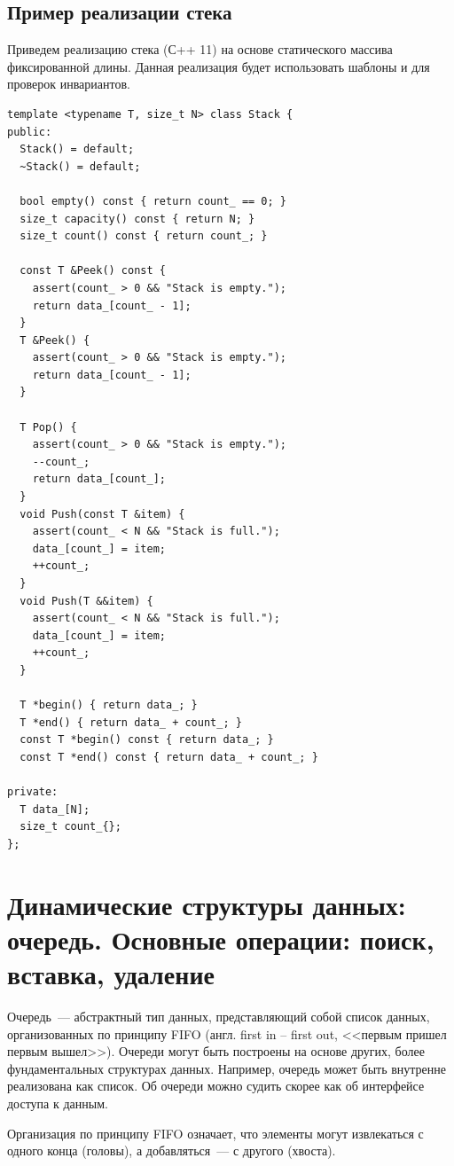 \subsection{Пример реализации стека}
Приведем реализацию стека (С++ 11) на основе статического массива фиксированной длины. Данная реализация будет использовать шаблоны и
 для проверок инвариантов.

\begin{verbatim}
template <typename T, size_t N> class Stack {
public:
  Stack() = default;
  ~Stack() = default;

  bool empty() const { return count_ == 0; }
  size_t capacity() const { return N; }
  size_t count() const { return count_; }

  const T &Peek() const {
    assert(count_ > 0 && "Stack is empty.");
    return data_[count_ - 1];
  }
  T &Peek() {
    assert(count_ > 0 && "Stack is empty.");
    return data_[count_ - 1];
  }

  T Pop() {
    assert(count_ > 0 && "Stack is empty.");
    --count_;
    return data_[count_];
  }
  void Push(const T &item) {
    assert(count_ < N && "Stack is full.");
    data_[count_] = item;
    ++count_;
  }
  void Push(T &&item) {
    assert(count_ < N && "Stack is full.");
    data_[count_] = item;
    ++count_;
  }

  T *begin() { return data_; }
  T *end() { return data_ + count_; }
  const T *begin() const { return data_; }
  const T *end() const { return data_ + count_; }

private:
  T data_[N];
  size_t count_{};
};
\end{verbatim}
\section{Динамические структуры данных: очередь. Основные операции: поиск, вставка, удаление}
Очередь~--- абстрактный тип данных, представляющий собой список данных, организованных по принципу FIFO (англ. first in -- first out, <<первым пришел первым вышел>>).
Очереди могут быть построены на основе других, более фундаментальных структурах данных. Например, очередь может быть внутренне реализована как
список. Об очереди можно судить скорее как об интерфейсе доступа к данным.

Организация по принципу FIFO означает, что элементы могут извлекаться с одного конца (головы), а добавляться~--- с другого (хвоста).

